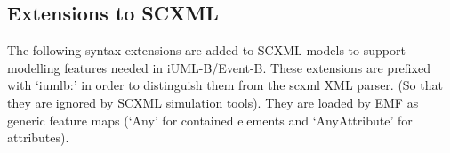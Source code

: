 \documentclass{easychair}
\begin{document}
\subsection{Extensions to SCXML}

The following syntax extensions are added to SCXML models 
to support modelling features needed in iUML-B/Event-B. 
These extensions are prefixed with ‘iumlb:’ in order to 
distinguish them from the scxml XML parser. (So that they 
are ignored by SCXML simulation tools). They are loaded by 
EMF as generic feature maps (‘Any’ for contained elements 
and ‘AnyAttribute’ for attributes).

\begin{table}[tbp]
\centering
{}
\caption{My caption}
\label{my-label}
\end{table}
\end{document}
